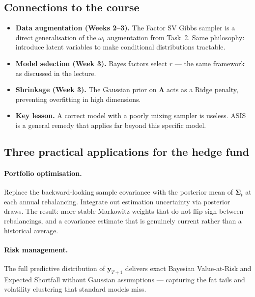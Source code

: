 \documentclass[11pt, a4paper]{article}\usepackage[]{graphicx}\usepackage[]{xcolor}
\begin{document}
\subsection{Connections to the course}

\begin{itemize}[itemsep=4pt]
  \item \textbf{Data augmentation (Weeks 2--3).}  The Factor SV Gibbs
        sampler is a direct generalisation of the $\omega_i$ augmentation
        from Task~2.  Same philosophy: introduce latent variables to make
        conditional distributions tractable.
  \item \textbf{Model selection (Week 3).}  Bayes factors select $r$ ---
        the same framework as discussed in the lecture.
  \item \textbf{Shrinkage (Week 3).}  The Gaussian prior on
        $\boldsymbol{\Lambda}$ acts as a Ridge penalty, preventing overfitting
        in high dimensions.
  \item \textbf{Key lesson.}  A correct model with a poorly mixing sampler
        is useless.  ASIS is a general remedy that applies far beyond this
        specific model.
\end{itemize}

\subsection{Three practical applications for the hedge fund}

\paragraph{Portfolio optimisation.}
Replace the backward-looking sample covariance with the posterior mean of
$\boldsymbol{\Sigma}_t$ at each annual rebalancing.  Integrate out estimation
uncertainty via posterior draws.  The result: more stable Markowitz weights
that do not flip sign between rebalancings, and a covariance estimate that
is genuinely current rather than a historical average.

\paragraph{Risk management.}
The full predictive distribution of $\mathbf{y}_{T+1}$ delivers exact
Bayesian Value-at-Risk and Expected Shortfall without Gaussian assumptions ---
capturing the fat tails and volatility clustering that standard models miss.
\end{document}
